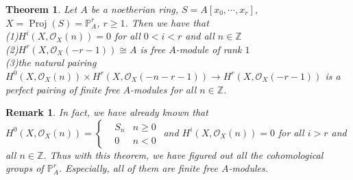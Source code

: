\documentclass{ctexart}
\newtheorem{remark}{Remark}[section]
\newtheorem{theorem}{Theorem}[section]
\newcommand{\proj}{\operatorname{Proj}}
\begin{document}
\begin{theorem}
    Let $A$ be a noetherian ring, $S= A[x_{0}, \cdots, x_{r}]$, $X = \proj(S) = \mathbb{P}_{A}^{r}$, $r \ge 1$.
    Then we have that \\ 
    (1)$H^{i}(X, \mathcal{O}_{X}(n)) = 0$ for all $0 < i < r$ and all $n\in \mathbb{Z}$ \\
    (2)$H^{r}(X, \mathcal{O}_{X}(-r - 1)) \cong A$ is free $A$-module of rank $1$ \\
    (3)the natural pairing $H^{0}(X, \mathcal{O}_{X}(n)) \times H^{r}(X, \mathcal{O}_{X}(-n - r - 1)) \longrightarrow H^{r}(X, \mathcal{O}_{X}(-r - 1))$ is a perfect pairing of finite free $A$-modules for all $n\in \mathbb{Z}$.
    \label{Theorem 2.6}
\end{theorem}
\begin{remark}
    In fact, we have already known that $H^{0}(X, \mathcal{O}_{X}(n)) =
    \left\{
        \begin{aligned}
            & S_{n} & n \ge 0 \\
            & 0 & n < 0
        \end{aligned}
    \right.$
    and $H^{i}(X, \mathcal{O}_{X}(n)) = 0$ for all $i > r$ and all $n\in \mathbb{Z}$.
    Thus with this theorem, we have figured out all the cohomological groups of $\mathbb{P}_{A}^{r}$.
    Especially, all of them are finite free $A$-modules.
\end{remark}
\end{document}
